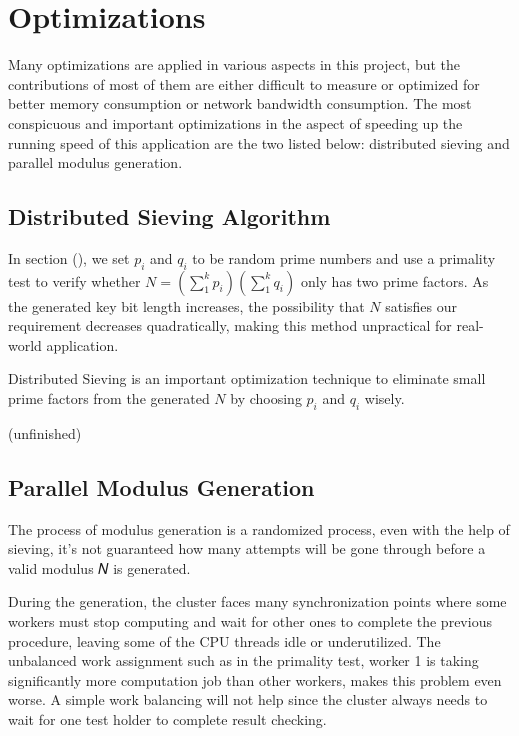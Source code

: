 \section{Optimizations}

Many optimizations are applied in various aspects in this project, but the contributions of most of them are either difficult to measure or optimized for better memory consumption or network bandwidth consumption. The most conspicuous and important optimizations in the aspect of speeding up the running speed of this application are the two listed below: distributed sieving and parallel modulus generation.

\subsection{Distributed Sieving Algorithm}

In section (), we set $p_i$ and $q_i$ to be random prime numbers and use a primality test to verify whether $N = \left( \sum_1^k p_i\right) \left( \sum_1^k q_i \right)$ only has two prime factors. As the generated key bit length increases, the possibility that $N$ satisfies our requirement decreases quadratically, making this method unpractical for real-world application.

Distributed Sieving is an important optimization technique to eliminate small prime factors from the generated $N$ by choosing $p_i$ and $q_i$ wisely.

(unfinished)

\subsection{Parallel Modulus Generation}

The process of modulus generation is a randomized process, even with the help of
sieving, it’s not guaranteed how many attempts will be gone through before a valid
modulus 𝑁 is generated.

During the generation, the cluster faces many synchronization points where some
workers must stop computing and wait for other ones to complete the previous
procedure, leaving some of the CPU threads idle or underutilized. The unbalanced
work assignment such as in the primality test, worker 1 is taking significantly more computation job than other workers, makes this problem even worse. A simple work balancing will not help since the cluster always needs to wait for one test holder to complete result checking.

